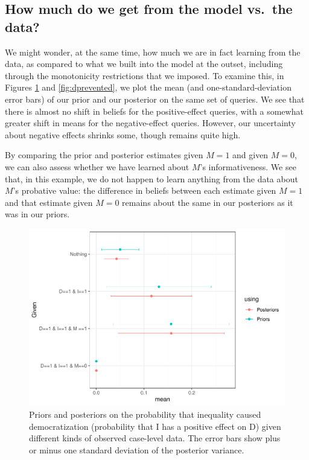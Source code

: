 \documentclass[
  12pt,
]{book}
\begin{document}
\hypertarget{how-much-do-we-get-from-the-model-vs.-the-data}{%
\subsection{How much do we get from the model vs.~the data?}\label{how-much-do-we-get-from-the-model-vs.-the-data}}

We might wonder, at the same time, how much we are in fact learning from the data, as compared to what we built into the model at the outset, including through the monotonicity restrictions that we imposed. To examine this, in Figures \ref{fig:dcaused} and \ref{fig:dprevented}, we plot the mean (and one-standard-deviation error bars) of our prior and our posterior on the same set of queries. We see that there is almost no shift in beliefs for the positive-effect queries, with a somewhat greater shift in means for the negative-effect queries. However, our uncertainty about negative effects shrinks some, though remains quite high.

By comparing the prior and posterior estimates given \(M=1\) and given \(M=0\), we can also assess whether we have learned about \(M\)'s informativeness. We see that, in this example, we do not happen to learn anything from the data about \(M\)'s probative value: the difference in beliefs between each estimate given \(M=1\) and that estimate given \(M=0\) remains about the same in our posteriors as it was in our priors.

\begin{figure}
\centering
\includegraphics{ii_files/figure-latex/dcaused-1.pdf}
\caption{\label{fig:dcaused}Priors and posteriors on the probability that inequality caused democratization (probability that I has a positive effect on D) given different kinds of observed case-level data. The error bars show plus or minus one standard deviation of the posterior variance.}
\end{figure}
\end{document}
